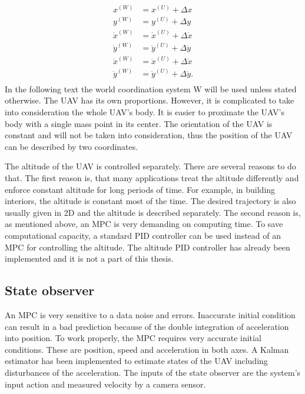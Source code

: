 \documentclass[a4paper,11pt,titlepage]{article}
\begin{document}
\begin{equation}
\label{eq:coordinate_transform}
\begin{split}
x^{(W)} &= x^{(U)}+\Delta x	\\
y^{(W)} &= y^{(U)}+\Delta y	\\
\dot{x}^{(W)} &= \dot{x}^{(U)}+\Delta \dot{x}	\\
\dot{y}^{(W)} &= \dot{y}^{(U)}+\Delta \dot{y}	\\
\ddot{x}^{(W)} &= \ddot{x}^{(U)}+\Delta \ddot{x}	\\
\ddot{y}^{(W)} &= \ddot{y}^{(U)}+\Delta \ddot{y}.	\\
\end{split}
\end{equation}
In the following text the world coordination system W will be used unless stated otherwise. The UAV has its own proportions. However, it is complicated to take into consideration the whole UAV's body. It is easier to proximate the UAV's body with a single mass point in its center. The orientation of the UAV is constant and will not be taken into consideration, thus the position of the UAV can be described by two coordinates. 

The altitude of the UAV is controlled separately. There are several reasons to do that. The first reason is, that many applications treat the altitude differently and enforce constant altitude for long periods of time. For example, in building interiors, the altitude is constant most of the time. The desired trajectory is also usually given in 2D and the altitude is described separately. The second reason is, as mentioned above, an MPC is very demanding on computing time. To save computational capacity, a standard PID controller can be used instead of an MPC for controlling the altitude. The altitude PID controller has already been implemented \cite{tomas} and it is not a part of this thesis. 

\subsection{State observer}
\label{sec:state_observer}
An MPC is very sensitive to a data noise and errors. Inaccurate initial condition can result in a bad prediction because of the double integration of acceleration into position. To work properly, the MPC requires very accurate initial conditions. These are position, speed and acceleration in both axes. A Kalman estimator has been implemented\cite{tomas} to estimate states of the UAV including disturbances of the acceleration. The inputs of the state observer are the system's input action and measured velocity by a camera sensor.
\end{document}
